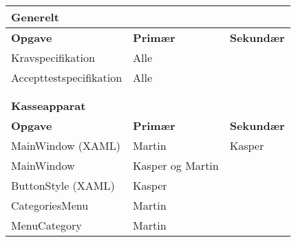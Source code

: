 \begin{table}[H]
	\begin{tabular}{lll}
		
		\hline
		\multicolumn{3}{|l|}{{\color{lblue} \textbf{Generelt}}}                                                                                        \\ \hline
		\multicolumn{1}{|l|}{\textbf{Opgave}}           & \multicolumn{1}{l|}{\textbf{Primær}}                       & \multicolumn{1}{l|}{\textbf{Sekundær}} \\ \hline
		\multicolumn{1}{|l|}{Kravspecifikation}         & \multicolumn{1}{l|}{Alle}                                  & \multicolumn{1}{l|}{}                  \\ \hline
		\multicolumn{1}{|l|}{Accepttestspecifikation}   & \multicolumn{1}{l|}{Alle}                                  & \multicolumn{1}{l|}{}                  \\ \hline
		& & \\& & \\ \hline                                                    
		
		
		\multicolumn{3}{|l|}{\color{lblue} \textbf{Kasseapparat}}                                                                                                               \\ \hline
		\multicolumn{1}{|l|}{\textbf{Opgave}}           & \multicolumn{1}{l|}{\textbf{Primær}}                       & \multicolumn{1}{l|}{\textbf{Sekundær}} \\ \hline
		\multicolumn{1}{|l|}{MainWindow (XAML)}         & \multicolumn{1}{l|}{Martin}                                  &
		\multicolumn{1}{l|}{Kasper}                  \\ \hline
		\multicolumn{1}{|l|}{MainWindow}         & \multicolumn{1}{l|}{Kasper og Martin}                                  & \multicolumn{1}{l|}{}                  \\ \hline
		
		\multicolumn{1}{|l|}{ButtonStyle (XAML)}         & \multicolumn{1}{l|}{Kasper}                                  & \multicolumn{1}{l|}{}                  \\ \hline
		
		\multicolumn{1}{|l|}{CategoriesMenu}         & \multicolumn{1}{l|}{Martin}                                  & \multicolumn{1}{l|}{}                  \\ \hline
		
		\multicolumn{1}{|l|}{MenuCategory}         & \multicolumn{1}{l|}{Martin}                                  & \multicolumn{1}{l|}{}                  \\ \hline
		

\end{tabular}
\end{table}
